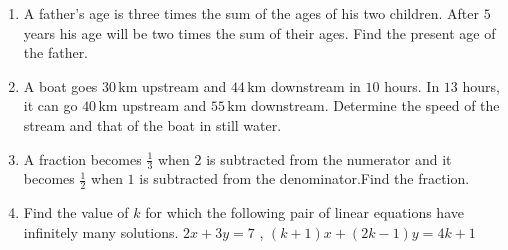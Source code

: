 \begin{enumerate}
\item A father's age is three times the sum of the ages of his two children. After $5$ years his age will be two times the sum of their ages. Find the present age of the father.
\item A boat goes $30 \,\text{km}$ upstream and $44 \,\text{km}$ downstream in $10$ hours. In $13$ hours, it can go $40\,\text{km}$ upstream and $55 \,\text{km}$ downstream. Determine the speed of the stream and that of the boat in still water.

\item A fraction becomes $\frac{1}{3}$ when $2$ is subtracted from the numerator and it becomes $\frac{1}{2}$ when $1$ is subtracted from the denominator.Find the fraction.

\item Find the value of $k$ for which the following pair of linear equations have infinitely many solutions. $2x+3y=7$ , $(k+1)x+(2k-1)y=4k+1$
\end{enumerate}